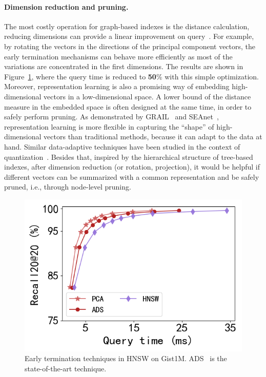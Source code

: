 \documentclass[11pt]{article}
\begin{document}
\paragraph{Dimension reduction and pruning.}
The most costly operation for graph-based indexes is the distance calculation, reducing dimensions can provide a linear improvement on query~\cite{adsampling}.
For example, by rotating the vectors in the directions of the principal component vectors, the early termination mechanisms can behave more efficiently as most of the variations are concentrated in the first dimensions.
The results are shown in Figure~\ref{zeyu_fig:pca}, where the query time is reduced to \textbf{50}\% with this simple optimization.
Moreover, representation learning is also a promising way of embedding high-dimensional vectors in a low-dimensional space. %
A lower bound of the distance measure in the embedded space is often designed at the same time, in order to safely perform pruning.
As demonstrated by GRAIL~\cite{grail} and SEAnet~\cite{seanet}, representation learning is more flexible in capturing the ``shape'' of high-dimensional vectors than traditional methods, because it can adapt to the data at hand.
Similar data-adaptive techniques have been studied in the context of quantization~\cite{vaq,lvq}.
Besides that, inspired by the hierarchical structure of tree-based indexes, after dimension reduction (or rotation, projection), it would be helpful if different vectors can be summarized with a common representation and be safely pruned, i.e., through node-level pruning.
\begin{figure}
\centering
\includegraphics[width=0.75\linewidth]{submissions/Zeyu2023/figs/ann-bulletin-gist.png}
\caption{Early termination techniques in HNSW on Gist1M. ADS~\cite{adsampling} is the state-of-the-art technique.}
\label{zeyu_fig:pca}
\end{figure}
\end{document}
